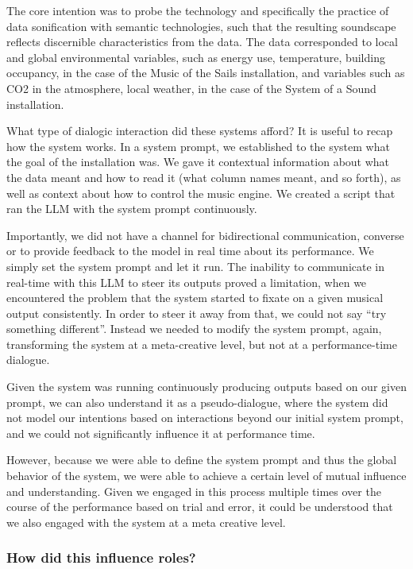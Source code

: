 The core intention was to probe the technology and specifically the practice of data sonification with semantic technologies, such that the resulting soundscape reflects discernible characteristics from the data. The data corresponded to local and global environmental variables, such as energy use, temperature, building occupancy, in the case of the Music of the Sails installation, and variables such as CO2 in the atmosphere, local weather, in the case of the System of a Sound installation. 

What type of dialogic interaction did these systems afford? It is useful to recap how the system works. In a system prompt, we established to the system what the goal of the installation was. We gave it contextual information about what the data meant and how to read it (what column names meant, and so forth), as well as context about how to control the music engine. We created a script that ran the LLM with the system prompt continuously. 

Importantly, we did not have a channel for bidirectional communication, converse or to provide feedback to the model in real time about its performance. We simply set the system prompt and let it run. The inability to communicate in real-time with this LLM to steer its outputs proved a limitation, when we encountered the problem that the system started to fixate on a given musical output consistently. In order to steer it away from that, we could not say ``try something different''. Instead we needed to modify the system prompt, again, transforming the system at a meta-creative level, but not at a performance-time dialogue. 

Given the system was running continuously producing outputs based on our given prompt, we can also understand it as a pseudo-dialogue, where the system did not model our intentions based on interactions beyond our initial system prompt, and we could not significantly influence it at performance time. 

However, because we were able to define the system prompt and thus the global behavior of the system, we were able to achieve a certain level of mutual influence and understanding. Given we engaged in this process multiple times over the course of the performance based on trial and error,  it could be understood that we also engaged with the system at a meta creative level. 

\subsubsection{How did this influence roles?}


